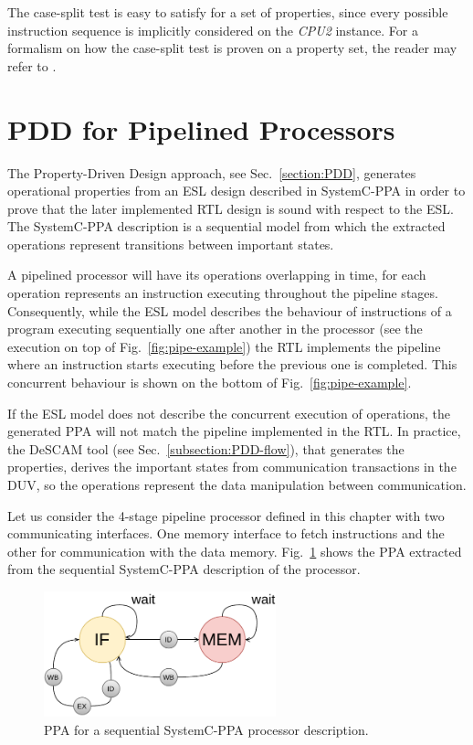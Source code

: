 The case-split test is easy to satisfy for a set of \SSQED{} properties, since every possible instruction sequence is implicitly considered on the \textit{CPU2} instance. For a formalism on how the case-split test is proven on a \SSQED{} property set, the reader may refer to \cite{paper-gapfree}.

\section{PDD for Pipelined Processors}
\label{section:pdd-pipe-processor}

The Property-Driven Design approach, see Sec.~\ref{section:PDD}, generates operational properties from an ESL design described in SystemC-PPA in order to prove that the later implemented RTL design is sound with respect to the ESL. The SystemC-PPA description is a sequential model from which the extracted operations represent transitions between important states. 

A pipelined processor will have its operations overlapping in time, for each operation represents an instruction executing throughout the pipeline stages. Consequently, while the ESL model describes the behaviour of instructions of a program executing sequentially one after another in the processor (see the execution on top of Fig.~\ref{fig:pipe-example}) the RTL implements the pipeline where an instruction starts executing before the previous one is completed. This concurrent behaviour is shown on the bottom of Fig.~\ref{fig:pipe-example}.

If the ESL model does not describe the concurrent execution of operations, the generated PPA will not match the pipeline implemented in the RTL. In practice, the DeSCAM tool (see Sec.~\ref{subsection:PDD-flow}), that generates the properties, derives the important states from communication transactions in the DUV, so the operations represent the data manipulation between communication. 

Let us consider the 4-stage pipeline processor defined in this chapter with two communicating interfaces. One memory interface to fetch instructions and the other for communication with the data memory. Fig.~\ref{fig:ppa-seq} shows the PPA extracted from the sequential SystemC-PPA description of the processor. 

\begin{figure}[htb!]
	\centering
	\includegraphics[width=0.6\textwidth]{images/PPA_old.pdf}
	\caption{PPA for a sequential SystemC-PPA processor description.}
	\label{fig:ppa-seq}
\end{figure}

